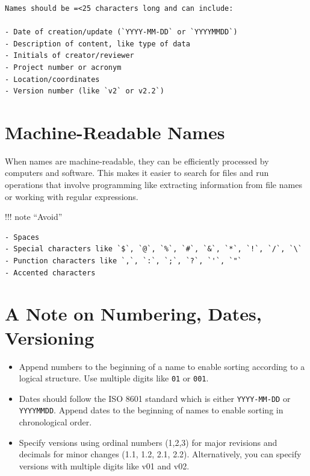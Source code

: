 \documentclass[
  letterpaper,
  DIV=11,
  numbers=noendperiod]{scrreprt}
\begin{document}
\begin{verbatim}
Names should be =<25 characters long and can include:

- Date of creation/update (`YYYY-MM-DD` or `YYYYMMDD`)
- Description of content, like type of data
- Initials of creator/reviewer
- Project number or acronym
- Location/coordinates
- Version number (like `v2` or v2.2`)
\end{verbatim}

\section*{Machine-Readable Names}\label{machine-readable-names}


When names are machine-readable, they can be efficiently processed by
computers and software. This makes it easier to search for files and run
operations that involve programming like extracting information from
file names or working with regular expressions.

!!! note ``Avoid''

\begin{verbatim}
- Spaces
- Special characters like `$`, `@`, `%`, `#`, `&`, `*`, `!`, `/`, `\`
- Punction characters like `,`, `:`, `;`, `?`, `'`, `"`
- Accented characters
\end{verbatim}

\section*{A Note on Numbering, Dates,
Versioning}\label{a-note-on-numbering-dates-versioning}


\begin{itemize}
\item
  Append numbers to the beginning of a name to enable sorting according
  to a logical structure. Use multiple digits like \texttt{01} or
  \texttt{001}.
\item
  Dates should follow the ISO 8601 standard which is either
  \texttt{YYYY-MM-DD} or \texttt{YYYYMMDD}. Append dates to the
  beginning of names to enable sorting in chronological order.
\item
  Specify versions using ordinal numbers (1,2,3) for major revisions and
  decimals for minor changes (1.1, 1.2, 2.1, 2.2). Alternatively, you
  can specify versions with multiple digits like v01 and v02.
\end{itemize}
\end{document}
